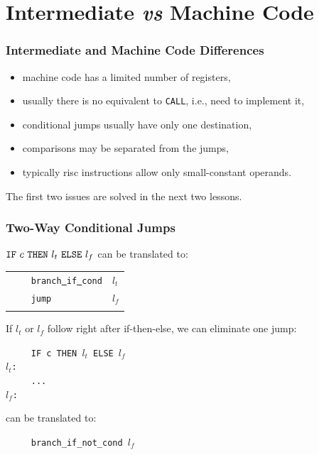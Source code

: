 \documentclass{beamer}
\renewcommand{\emph}[1]{\textcolor{structure}{#1}}
\newcommand{\emp}[1]{\textcolor{DikuRed}{ #1}}
\begin{document}
\section{Intermediate {\em vs} Machine Code}

\begin{frame}[fragile]
	\tableofcontents[currentsection]
\end{frame}

\begin{frame}[fragile,t]
   \frametitle{Intermediate and Machine Code Differences}

\bigskip
\bigskip

\begin{itemize}

    \item \alert{machine code has a limited number of registers,}\bigskip

    \item \alert{usually there is no equivalent to \texttt{CALL}, i.e., need to implement it,}\bigskip

    \item conditional jumps usually have only one destination,\bigskip

    \item comparisons may be separated from the jumps,\bigskip

    \item typically {\sc risc} instructions allow only small-constant operands.

\end{itemize}

\bigskip
\bigskip

\alert{The first two issues are solved in the next two lessons.}


\end{frame}


\begin{frame}
\frametitle{Two-Way Conditional Jumps}

${\tt IF}~c~{\tt THEN}~l_t~{\tt ELSE}~l_f$ can be translated to:

\begin{tabular}{ll}\\
\emp{{\tt~~~~branch\underline{~}if\underline{~}cond}} & \emp{$l_t$} \\
\emp{{\tt~~~~jump}} & \emp{$l_f$}\\
\\
\end{tabular}

\bigskip

If $l_t$ or $l_f$ follow right after {\sc if-then-else}, we can \emph{eliminate one jump}:\smallskip

\emp{\tt~~~~~IF c THEN $l_t$ ELSE $l_f$}\\
\emp{\tt{}$l_t$:}\\
\emp{\tt~~~~~...}\\
\emp{\tt{}$l_f$:}

\smallskip

can be translated to:\smallskip

\emp{\tt~~~~~branch\_if\_not\_cond $l_f$}

\end{frame}
\end{document}
